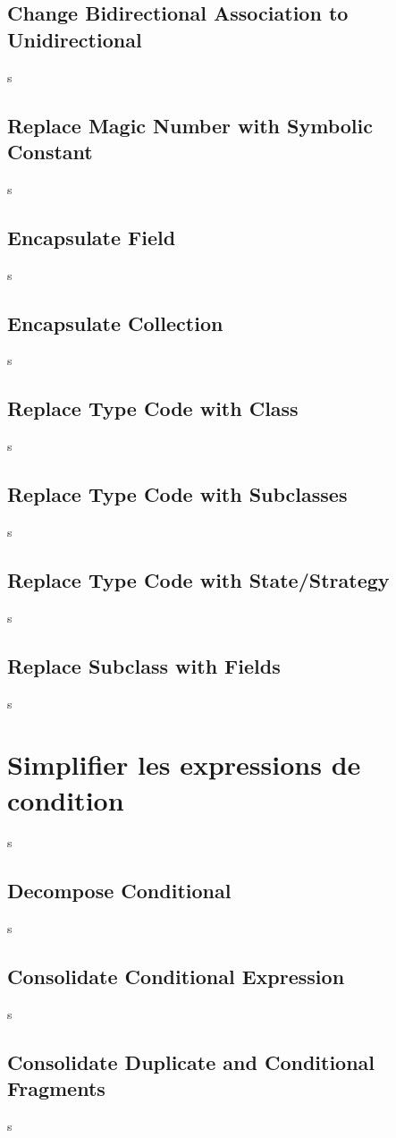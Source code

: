 \documentclass[a4paper,twoside,12pt,openright]{report}
\begin{document}
\subsection{Change Bidirectional Association to Unidirectional}
s
\subsection{Replace Magic Number with Symbolic Constant}
s
\subsection{Encapsulate Field}
s
\subsection{Encapsulate Collection}
s
\subsection{Replace Type Code with Class}
s
\subsection{Replace Type Code with Subclasses}
s
\subsection{Replace Type Code with State/Strategy}
s
\subsection{Replace Subclass with Fields}
s



\newpage
\section{Simplifier les expressions de condition}
s
\subsection{Decompose Conditional}
s
\subsection{Consolidate Conditional Expression}
s
\subsection{Consolidate Duplicate and Conditional Fragments}
s
\end{document}
